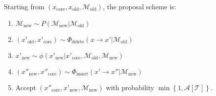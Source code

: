 \documentclass[aps,pre,twocolumn,nofootinbib,superscriptaddress,linenumbers,11point]{revtex4-1}
\begin{document}
Starting from $(x_\mathrm{core}, x_\mathrm{old}, \mathcal{M}_\mathrm{old})$, the proposal scheme is:
\begin{enumerate}
\item $\mathcal{M}_\mathrm{new} \sim P(\mathcal{M}_\mathrm{new} | \mathcal{M}_\mathrm{old})$
\item $(x'_\mathrm{old}, x'_\mathrm{core}) \sim \Phi_\mathrm{delete}(x \rightarrow x' | \mathcal{M}_\mathrm{old})$
\item $x'_\mathrm{new} \sim \phi(x'_\mathrm{new} | x'_\mathrm{core}, \mathcal{M}_\mathrm{old}, \mathcal{M}_\mathrm{new})$
\item $(x''_\mathrm{new}, x''_\mathrm{core}) \sim \Phi_\mathrm{insert}(x' \rightarrow x'' | \mathcal{M}_\mathrm{new})$
\item Accept $(x''_\mathrm{core}, x'_\mathrm{new}, \mathcal{M}_\mathrm{new})$ with probability $\min\left\{1, \mathcal{A}[\mathcal{T}]\right\}$.
\end{enumerate}
\end{document}
